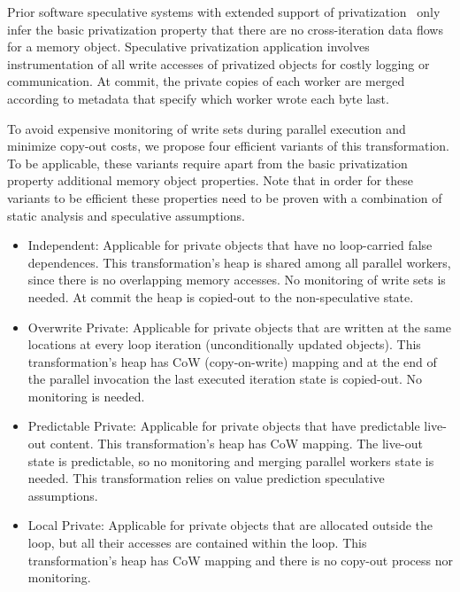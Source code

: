Prior software speculative systems with extended support of
privatization~\cite{johnson:12:pldi,kim:12:cgo} only infer the basic
privatization property that there are no cross-iteration data flows
for a memory object.
%
Speculative privatization application involves instrumentation of all
write accesses of privatized objects for costly logging or
communication. At commit, the private copies of each worker are merged
according to metadata that specify which worker wrote each byte last.

To avoid expensive monitoring of write sets during parallel execution
and minimize copy-out costs, we propose four efficient variants of
this transformation.
%
To be applicable, these variants require apart from the basic
privatization property additional memory object properties. Note that
in order for these variants to be efficient these properties need to
be proven with a combination of static analysis and speculative
assumptions.

\begin{itemize}
%
\item Independent: Applicable for private objects that have no
loop-carried false dependences. This transformation's heap is shared
among all parallel workers, since there is no overlapping memory
accesses.
%
No monitoring of write sets is needed. At commit the heap is copied-out
to the non-speculative state.
%


\item Overwrite Private: Applicable for private objects that are
written at the same locations at every loop iteration (unconditionally
updated objects). This transformation's heap has CoW (copy-on-write) mapping
and at the end of the parallel invocation the last executed iteration
state is copied-out. No monitoring is needed.

%

\item Predictable Private: Applicable for private objects that have
predictable live-out content. This transformation's heap has CoW mapping. The
live-out state is predictable, so no monitoring and merging parallel
workers state is needed. This transformation relies on value
prediction speculative assumptions.

\item Local Private: Applicable for private objects that are allocated
outside the loop, but all their accesses are contained within the
loop. This transformation's heap has CoW mapping and there is no copy-out
process nor monitoring.

\end{itemize}

